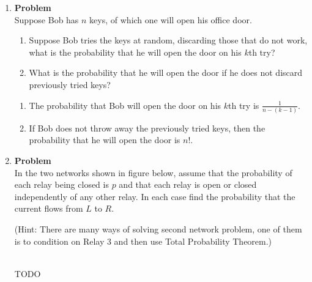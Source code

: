 \documentclass[12pt]{article}
\newenvironment{Ex}{\textbf{Problem}\vspace{.75em}\\}{}
\begin{document}
\begin{enumerate}
  \item
    \begin{Ex}
      Suppose Bob has $n$ keys, of which one will open his office
      door.
      \begin{enumerate}
      \item Suppose Bob tries the keys at random, discarding those
        that do not work, what is the probability that he will open
        the door on his $k$th try?
      \item What is the probability that he will open the door if he
        does not discard previously tried keys?
      \end{enumerate}
      \begin{solution} \hfill
        \begin{enumerate}
        \item The probability that Bob will open the door on his $k$th
          try is $\frac{1}{n-(k-1)}$.
        \item If Bob does not throw away the previously tried keys,
          then the probability that he will open the door is $n!$.
        \end{enumerate}
      \end{solution}
    \end{Ex}
  \item
    \begin{Ex}
      In the two networks shown in figure below, assume that the
      probability of each relay being closed is $p$ and that each
      relay is open or closed independently of any other relay. In
      each case find the probability that the current flows from $L$
      to $R$.

      (Hint: There are many ways of solving second network problem,
      one of them is to condition on Relay 3 and then use Total
      Probability Theorem.)
      \begin{solution} \hfill \\
        {\huge TODO}
      \end{solution}
    \end{Ex}
\end{enumerate}
\end{document}
